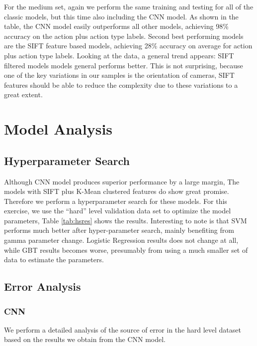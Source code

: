 \documentclass[
	a4paper, %
	10pt, %
	unnumberedsections, %
	twoside, %
]{t0004}
\begin{document}
For the medium set, again we perform the same training and testing for all of the classic models, but this time also including the CNN model. As shown in the table, the CNN model easily outperforms all other models, achieving 98\% accuracy on the action plus action type labels. Second best performing models are the SIFT feature based models, achieving 28\% accuracy on average for action plus action type labels. Looking at the data, a general trend appears: SIFT filtered models models general performs better. This is not surprising, because one of the key variations in our samples is the orientation of cameras, SIFT features should be able to reduce the complexity due to these variations to a great extent.

\section{Model Analysis}

\subsection{Hyperparameter Search}

Although CNN model produces superior performance by a large margin, The models with SIFT plus K-Mean clustered features do show great promise. Therefore we perform a hyperparameter search for these models. For this exercise, we use the ``hard'' level validation data set to optimize the model parameters, Table \ref{tab:hsres} shows the results. Interesting to note is that SVM performs much better after hyper-parameter search, mainly benefiting from gamma parameter change. Logistic Regression results does not change at all, while GBT results becomes worse, presumably from using a much smaller set of data to estimate the parameters.

\subsection{Error Analysis}

\subsubsection{CNN} We perform a detailed analysis of the source of error in the hard level dataset based on the results we obtain from the CNN model.
\end{document}
